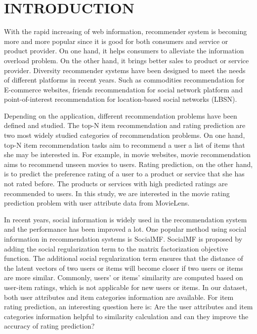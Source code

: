 \documentclass{llncs}
\begin{document}
	
	
	\section{INTRODUCTION}
	With the rapid increasing of web information, recommender system is becoming more and more popular since it is good for both consumers and service or product provider.
	On one hand, it helps consumers to alleviate the information overload problem. On the other hand, it brings better sales to product or service provider.
	Diversity recommender systems have been designed to meet the needs of different platforms in recent years.
	Such as commodities recommendation for E-commerce websites, friends recommendation for social network platform
	and point-of-interest recommendation for location-based social networks (LBSN).
	
	Depending on the application, different recommendation problems have been defined and studied.
	The top-N item recommendation and rating prediction are two most widely studied categories of recommendation problems.
	On one hand, top-N item recommendation tasks aim to recommend a user a list of items that she may be interested in.
	For example, in movie websites, movie recommendation aims to recommend unseen movies to users.
	Rating prediction, on the other hand, is to predict the preference rating of a user to a product or service that she has not rated before.
	The products or services with high predicted ratings are recommended to users. In this study, we are interested in
	the movie rating prediction problem with user attribute data from MovieLens.
	
	In recent years, social information is widely used in the recommendation system and the performance has been improved a lot.
	One popular method using social information in recommendation systems is SocialMF\cite{SIGIR201301}.
	SocialMF is proposed by adding the social regularization term to the matrix factorization objective function.
	The additional social regularization term ensures that the distance of the latent vectors of two users or items will become closer
	if  two users or items are more similar.
	Commonly, users' or items' similarity are computed based on user-item ratings,
	which is not applicable for new users or items.
	In our dataset, both user attributes and item categories information are available.
	For item rating prediction, an interesting question here is:
	Are the user attributes and item categories information helpful to similarity calculation
	and can they improve the accuracy of rating prediction?
	
\end{document}
